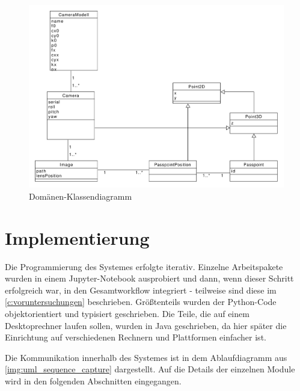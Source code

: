 \documentclass[./00PhotoBox.tex]{subfiles}
\begin{document}
\begin{figure}
  \centering
  \includegraphics[width=1\textwidth]{./img/uml/uml_domain.pdf}
  \caption{Domänen-Klassendiagramm} %
  \label{img:dokladia} %
\end{figure}

\section{Implementierung}
\label{sec:Implementierung}


Die Programmierung des Systemes erfolgte iterativ. Einzelne Arbeitspakete wurden in einem Jupyter-Notebook ausprobiert und dann, wenn dieser Schritt erfolgreich war, in den Gesamtworkflow integriert - teilweise sind diese im \autoref{c:voruntersuchungen} beschrieben. Größtenteils wurden der Python-Code objektorientiert und typisiert geschrieben. Die Teile, die auf einem Desktoprechner laufen sollen, wurden in Java geschrieben, da hier später die Einrichtung auf verschiedenen Rechnern und Plattformen einfacher ist.

Die Kommunikation innerhalb des Systemes ist in dem Ablaufdiagramm aus \autoref{img:uml_sequence_capture} dargestellt. Auf die Details der einzelnen Module wird in den folgenden Abschnitten eingegangen.
\end{document}
